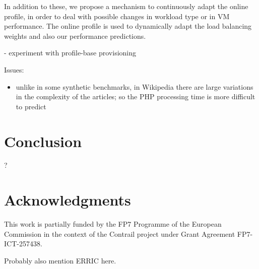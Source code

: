 \documentclass[10pt,twocolumn]{article}
\begin{document}
In addition to these, we propose a mechanism to continuously adapt the online profile,
in order to deal with possible changes in workload type or in VM performance.
The online profile is used to dynamically adapt the load balancing weights and
also our performance predictions.

- experiment with profile-base provisioning


Issues:
\begin{itemize}
\item unlike in some synthetic benchmarks, in Wikipedia there are large variations
in the complexity of the articles; so the PHP processing time is more difficult 
to predict
\end{itemize}



\section*{Conclusion}


?


\section*{Acknowledgments}

This work is partially funded by the FP7 Programme of the European
Commission in the context of the Contrail project under Grant
Agreement FP7-ICT-257438.

Probably also mention ERRIC here.




\end{document}
